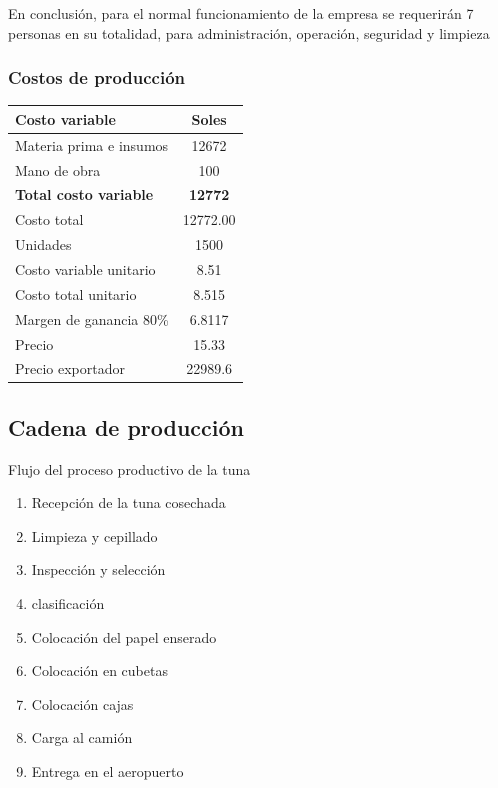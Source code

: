 \documentclass[
  stu,
  floatsintext,
  longtable,
  a4paper,
  nolmodern,
  notxfonts,
  notimes,
  colorlinks=true,linkcolor=blue,citecolor=blue,urlcolor=blue]{apa7}
\begin{document}
En conclusión, para el normal funcionamiento de la empresa se requerirán
7 personas en su totalidad, para administración, operación, seguridad y
limpieza

\subsubsection{Costos de producción}\label{costos-de-producciuxf3n}

\begin{longtable}[]{@{}lc@{}}
\toprule\noalign{}
\textbf{Costo variable} & \textbf{Soles} \\
\midrule\noalign{}
\endhead
\bottomrule\noalign{}
\endlastfoot
Materia prima e insumos & 12672 \\
Mano de obra & 100 \\
\textbf{Total costo variable} & \textbf{12772} \\
Costo total & 12772.00 \\
Unidades & 1500 \\
Costo variable unitario & 8.51 \\
Costo total unitario & 8.515 \\
Margen de ganancia 80\% & 6.8117 \\
Precio & 15.33 \\
Precio exportador & 22989.6 \\
\end{longtable}

\subsection{Cadena de producción}\label{cadena-de-producciuxf3n}

Flujo del proceso productivo de la tuna

\begin{enumerate}
\def\labelenumi{\arabic{enumi}.}
\item
  Recepción de la tuna cosechada
\item
  Limpieza y cepillado
\item
  Inspección y selección
\item
  clasificación
\item
  Colocación del papel enserado
\item
  Colocación en cubetas
\item
  Colocación cajas
\item
  Carga al camión
\item
  Entrega en el aeropuerto
\end{enumerate}
\end{document}
